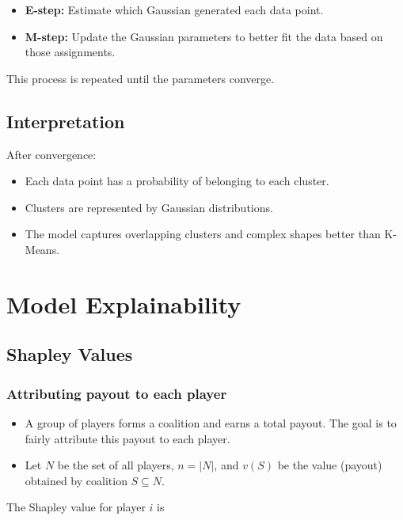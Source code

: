 \documentclass[10pt,a4paper]{article}
\begin{document}
	\begin{itemize}

		\item \textbf{E-step:}
		Estimate which Gaussian generated each data point.

		\item \textbf{M-step:}
		Update the Gaussian parameters to better fit the data based on those assignments.

	\end{itemize}

	This process is repeated until the parameters converge.

	\subsection{Interpretation}

	After convergence:

	\begin{itemize}
		\item Each data point has a probability of belonging to each cluster.
		\item Clusters are represented by Gaussian distributions.
		\item The model captures overlapping clusters and complex shapes better than K-Means.
	\end{itemize}

	
	\section{Model Explainability}
		\subsection{Shapley Values}
		\subsubsection{Attributing payout to each player}
		\begin{itemize}
			\item A group of players forms a coalition and earns a total payout. The goal is to fairly attribute this payout to each player.
			\item Let $N$ be the set of all players, $n = |N|$, and $v(S)$ be the value (payout) obtained by coalition $S \subseteq N$.
		\end{itemize}
	
		The Shapley value for player $i$ is
	
\end{document}
